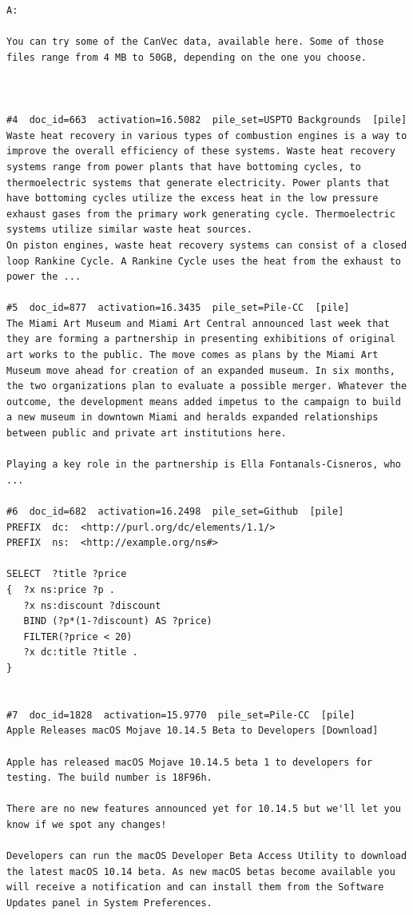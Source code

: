 \begin{verbatim}
A:

You can try some of the CanVec data, available here. Some of those files range from 4 MB to 50GB, depending on the one you choose.



#4  doc_id=663  activation=16.5082  pile_set=USPTO Backgrounds  [pile]
Waste heat recovery in various types of combustion engines is a way to improve the overall efficiency of these systems. Waste heat recovery systems range from power plants that have bottoming cycles, to thermoelectric systems that generate electricity. Power plants that have bottoming cycles utilize the excess heat in the low pressure exhaust gases from the primary work generating cycle. Thermoelectric systems utilize similar waste heat sources.
On piston engines, waste heat recovery systems can consist of a closed loop Rankine Cycle. A Rankine Cycle uses the heat from the exhaust to power the ...

#5  doc_id=877  activation=16.3435  pile_set=Pile-CC  [pile]
The Miami Art Museum and Miami Art Central announced last week that they are forming a partnership in presenting exhibitions of original art works to the public. The move comes as plans by the Miami Art Museum move ahead for creation of an expanded museum. In six months, the two organizations plan to evaluate a possible merger. Whatever the outcome, the development means added impetus to the campaign to build a new museum in downtown Miami and heralds expanded relationships between public and private art institutions here.

Playing a key role in the partnership is Ella Fontanals-Cisneros, who ...

#6  doc_id=682  activation=16.2498  pile_set=Github  [pile]
PREFIX  dc:  <http://purl.org/dc/elements/1.1/>
PREFIX  ns:  <http://example.org/ns#>

SELECT  ?title ?price
{  ?x ns:price ?p .
   ?x ns:discount ?discount
   BIND (?p*(1-?discount) AS ?price)
   FILTER(?price < 20)
   ?x dc:title ?title . 
}


#7  doc_id=1828  activation=15.9770  pile_set=Pile-CC  [pile]
Apple Releases macOS Mojave 10.14.5 Beta to Developers [Download]

Apple has released macOS Mojave 10.14.5 beta 1 to developers for testing. The build number is 18F96h.

There are no new features announced yet for 10.14.5 but we'll let you know if we spot any changes!

Developers can run the macOS Developer Beta Access Utility to download the latest macOS 10.14 beta. As new macOS betas become available you will receive a notification and can install them from the Software Updates panel in System Preferences.


\end{verbatim}

